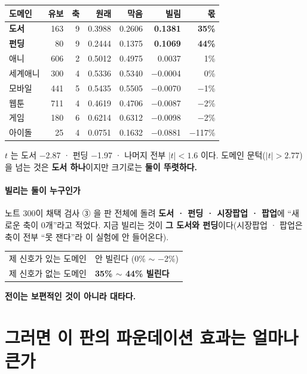 \documentclass[10pt]{article}
\begin{document}
\begin{center}\scriptsize
\begin{tabular}{lrrrrrr}
\hline
도메인 & 유보 & 축 & 원래 & 막음 & 빌림 & 몫 \\
\hline
\textbf{도서} & 163 & 9 & 0.3988 & 0.2606 & \textbf{0.1381} & \textbf{35\%} \\
\textbf{펀딩} & 80 & 9 & 0.2444 & 0.1375 & \textbf{0.1069} & \textbf{44\%} \\
\hline
애니 & 606 & 2 & 0.5012 & 0.4975 & 0.0037 & 1\% \\
세계애니 & 300 & 4 & 0.5336 & 0.5340 & $-$0.0004 & 0\% \\
모바일 & 441 & 5 & 0.5435 & 0.5505 & $-$0.0070 & $-$1\% \\
웹툰 & 711 & 4 & 0.4619 & 0.4706 & $-$0.0087 & $-$2\% \\
게임 & 180 & 6 & 0.6214 & 0.6312 & $-$0.0098 & $-$2\% \\
아이돌 & 25 & 4 & 0.0751 & 0.1632 & $-$0.0881 & $-$117\% \\
\hline
\end{tabular}
\end{center}

$t$ 는 도서 $-$2.87 · 펀딩 $-$1.97 · 나머지 전부 $|t|{<}1.6$ 이다.
도메인 문턱($|t|{>}2.77$)을 넘는 것은 \textbf{도서 하나}이지만 크기로는
\textbf{둘이 뚜렷하다.}

\paragraph{빌리는 둘이 누구인가} 노트 300이 채택 검사 ③ 을 판 전체에 돌려
\textbf{도서 · 펀딩 · 시장팝업 · 팝업}에 ``새로운 축이 0개''라고 적었다.
지금 빌리는 것이 \textbf{그 도서와 펀딩}이다(시장팝업 · 팝업은 축이 전부
``못 잰다''라 이 실험에 안 들어온다).

\begin{center}\small
\begin{tabular}{ll}
\hline
제 신호가 있는 도메인 & 안 빌린다 (0\% $\sim$ $-$2\%) \\
제 신호가 없는 도메인 & \textbf{35\% $\sim$ 44\% 빌린다} \\
\hline
\end{tabular}
\end{center}

\textbf{전이는 보편적인 것이 아니라 대타다.}

\section{그러면 이 판의 파운데이션 효과는 얼마나 큰가}
\end{document}
